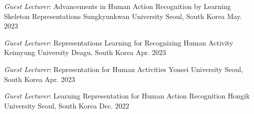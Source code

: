 \vspace{.5em}

\cventry
{\textit{Guest Lecturer}: Advancements in Human Action Recognition by Learning Skeleton Representations}
{Sungkyunkwan University}
{Seoul, South Korea}
{May. 2023}
{}
\vspace{-1em}


\cventry
{\textit{Guest Lecturer}: Representations Learning for Recognizing Human Activity}
{Keimyung University}
{Deagu, South Korea}
{Apr. 2023}
{}


\vspace{-1em}
\cventry
{\textit{Guest Lecturer}: Representation for Human Activities}
{Yonsei University}
{Seoul, South Korea}
{Apr. 2023}
{}

\vspace{-1em}
\cventry
{\textit{Guest Lecturer}: Learning Representation for Human Action Recognition}
{Hongik University}
{Seoul, South Korea}
{Dec. 2022}
{}
\vspace{-1em}


